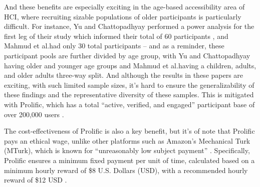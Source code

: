 \documentclass[12pt,twoside]{reedthesis}
\begin{document}
    And these benefits are especially exciting in the age-based accessibility area of HCI, where recruiting sizable populations of older participants is particularly difficult. For instance, Yu and Chattopadhyay performed a power analysis for the first leg of their study which informed their total of 60 participants \cite{yu_reducing_2024}, and Mahmud et al.\@ had only 30 total participants \cite{mahmud_learning_2020} -- and as a reminder, these participant pools are further divided by age group, with Yu and Chattopadhyay having older and younger age groups and Mahmud et al.\@ having a children, adults, and older adults three-way split. And although the results in these papers are exciting, with such limited sample sizes, it's hard to ensure the generalizability of these findings and the representative diversity of these samples. This is mitigated with Prolific, which has a total \enquote{active, verified, and engaged} participant base of over 200,000 users \cite{run_prolific}.
    
    The cost-effectiveness of Prolific is also a key benefit, but it's of note that Prolific pays an ethical wage, unlike other platforms such as Amazon's Mechanical Turk (MTurk), which is known for \enquote{unreasonably low subject payment} \cite{palan_prolificacsubject_2018}. Specifically, Prolific ensures a minimum fixed payment per unit of time, calculated based on a minimum hourly reward of \$8 U.S. Dollars (USD), with a recommended hourly reward of \$12 USD \cite{how_prolific}. 

\end{document}
